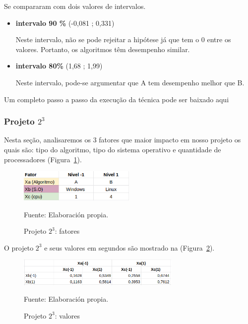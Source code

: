 \documentclass[12pt]{article}
\begin{document}
Se compararam com dois valores de intervalos.

\begin{itemize}
	\item \textbf{intervalo 90 \%}
		(-0,081 ; 0,331)
		
		Neste intervalo, não se pode rejeitar a hipótese já que tem o 0 entre os valores. Portanto, os algoritmos têm desempenho similar.
		
	\item \textbf{intervalo 80\%}
		(1,68 ; 1,99)
		
		Neste intervalo, pode-se argumentar que A tem desempenho melhor que B.	 
		 
\end{itemize}	

Um completo passo a passo da execução da técnica pode ser baixado aqui 

\subsubsection{Projeto ${2^3}$}

Nesta seção, analisaremos os 3 fatores que maior impacto em nosso projeto os quais são: tipo do algoritmo, tipo do sistema operativo e quantidade de processadores (Figura~\ref{figure:projeto_2_fatores}).

\begin{figure}[!ht]
	\begin{center}
		\includegraphics[width=0.5\textwidth]{images/projeto_2_fatores}
	\end{center}
	\begin{center}
		\caption{\label{figure:projeto_2_fatores}
			\small{Projeto ${2^3}$: fatores}}
		{\small{Fuente: Elaboración propia.}}
	\end{center}
\end{figure}

O projeto ${2^3}$ e seus valores em segundos são mostrado na (Figura~\ref{figure:projeto_2_valores}).

\begin{figure}[!ht]
	\begin{center}
		\includegraphics[width=0.7\textwidth]{images/projeto_2_valores}
	\end{center}
	\begin{center}
		\caption{\label{figure:projeto_2_valores}
			\small{Projeto ${2^3}$: valores}}
		{\small{Fuente: Elaboración propia.}}
	\end{center}
\end{figure}
\end{document}
